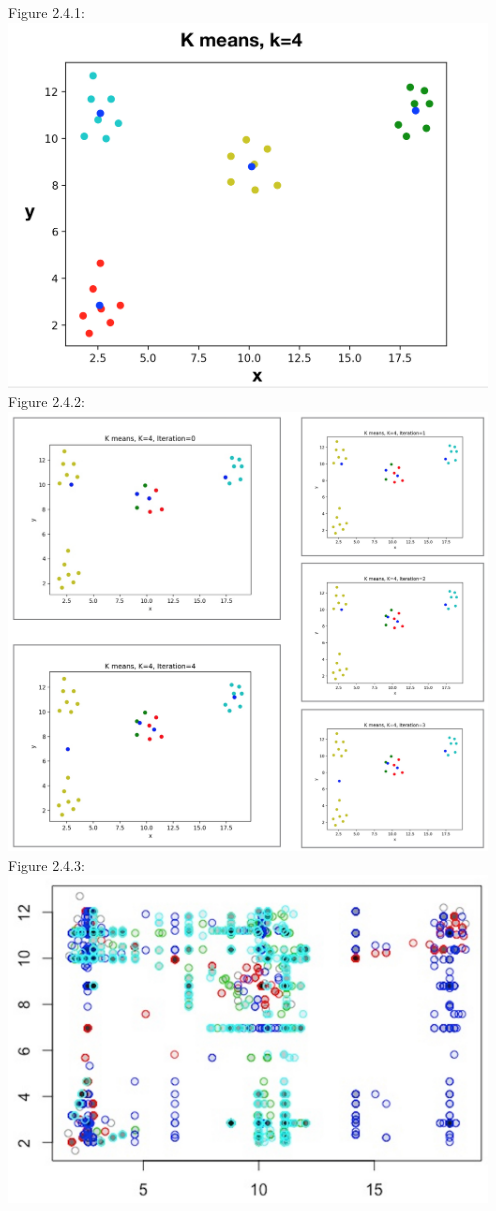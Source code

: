 \documentclass[12pt]{article}
\begin{document}
  Figure 2.4.1:\\
  \includegraphics[width=5in]{plots/km_plot1.jpeg}\\
  Figure 2.4.2:\\
  \includegraphics[width=5in]{plots/km_plot2.jpeg}\\
  Figure 2.4.3:\\
  \includegraphics[width=5in]{plots/km_plot3.jpeg}\\
\end{document}
